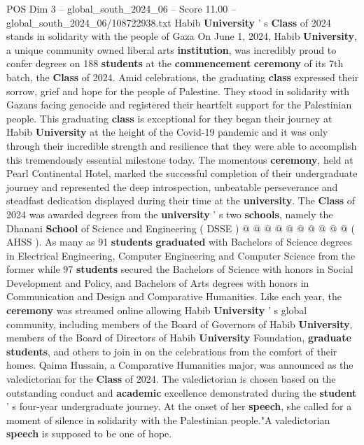 \begin{textsample}{POS Dim 3 – global\_south\_2024\_06 – Score 11.00 – global\_south\_2024\_06/108722938.txt}  \label{ex:f3_pos_340}
Habib \textbf{University} ' s \textbf{Class} of 2024 stands in solidarity with the people of Gaza On June 1, 2024, Habib \textbf{University}, a unique community owned liberal arts \textbf{institution}, was incredibly proud to confer degrees on 188 \textbf{students} at the \textbf{commencement} \textbf{ceremony} of its 7th batch, the \textbf{Class} of 2024.
Amid celebrations, the graduating \textbf{class} expressed their sorrow, grief and hope for the people of Palestine.
They stood in solidarity with Gazans facing genocide and registered their heartfelt support for the Palestinian people.
This graduating \textbf{class} is exceptional for they began their journey at Habib \textbf{University} at the height of the Covid-19 pandemic and it was only through their incredible strength and resilience that they were able to accomplish this tremendously essential milestone today.
The momentous \textbf{ceremony}, held at Pearl Continental Hotel, marked the successful completion of their undergraduate journey and represented the deep introspection, unbeatable perseverance and steadfast dedication displayed during their time at the \textbf{university}.
The \textbf{Class} of 2024 was awarded degrees from the \textbf{university} ' s two \textbf{schools}, namely the Dhanani \textbf{School} of Science and Engineering ( DSSE ) @ @ @ @ @ @ @ @ @ @ ( AHSS ).
As many as 91 \textbf{students} \textbf{graduated} with Bachelors of Science degrees in Electrical Engineering, Computer Engineering and Computer Science from the former while 97 \textbf{students} secured the Bachelors of Science with honors in Social Development and Policy, and Bachelors of Arts degrees with honors in Communication and Design and Comparative Humanities.
Like each year, the \textbf{ceremony} was streamed online allowing Habib \textbf{University} ' s global community, including members of the Board of Governors of Habib \textbf{University}, members of the Board of Directors of Habib \textbf{University} Foundation, \textbf{graduate} \textbf{students}, and others to join in on the celebrations from the comfort of their homes.
Qaima Hussain, a Comparative Humanities major, was announced as the valedictorian for the \textbf{Class} of 2024.
The valedictorian is chosen based on the outstanding conduct and \textbf{academic} excellence demonstrated during the \textbf{student} ' s four-year undergraduate journey.
At the onset of her \textbf{speech}, she called for a moment of silence in solidarity with the Palestinian people."A valedictorian \textbf{speech} is supposed to be one of hope.

\end{textsample}
